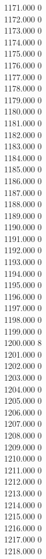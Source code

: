 { 1171.000	0 \\
 1172.000	0 \\
 1173.000	0 \\
 1174.000	0 \\
 1175.000	0 \\
 1176.000	0 \\
 1177.000	0 \\
 1178.000	0 \\
 1179.000	0 \\
 1180.000	0 \\
 1181.000	0 \\
 1182.000	0 \\
 1183.000	0 \\
 1184.000	0 \\
 1185.000	0 \\
 1186.000	0 \\
 1187.000	0 \\
 1188.000	0 \\
 1189.000	0 \\
 1190.000	0 \\
 1191.000	0 \\
 1192.000	0 \\
 1193.000	0 \\
 1194.000	0 \\
 1195.000	0 \\
 1196.000	0 \\
 1197.000	0 \\
 1198.000	0 \\
 1199.000	0 \\
 1200.000	8 \\
 1201.000	0 \\
 1202.000	0 \\
 1203.000	0 \\
 1204.000	0 \\
 1205.000	0 \\
 1206.000	0 \\
 1207.000	0 \\
 1208.000	0 \\
 1209.000	0 \\
 1210.000	0 \\
 1211.000	0 \\
 1212.000	0 \\
 1213.000	0 \\
 1214.000	0 \\
 1215.000	0 \\
 1216.000	0 \\
 1217.000	0 \\
 1218.000	0 \\
}
